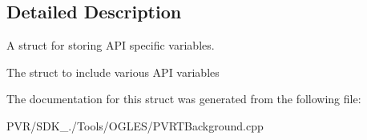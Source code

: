 \subsection{Detailed Description}
A struct for storing A\+P\+I specific variables. 

The struct to include various A\+P\+I variables



 

The documentation for this struct was generated from the following file\+:\begin{DoxyCompactItemize}
\item 
P\+V\+R/\+S\+D\+K\+\_./\+Tools/\+O\+G\+L\+E\+S/P\+V\+R\+T\+Background.\+cpp\end{DoxyCompactItemize}
